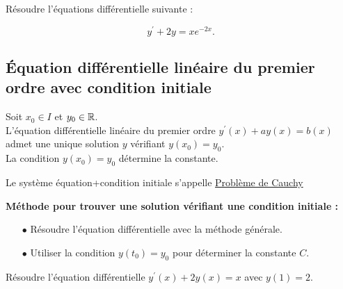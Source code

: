 \documentclass[a4paper, 11pt]{article}
\begin{document}
\newpage
\begin{exercice}
  R\'esoudre l'\'equations diff\'erentielle suivante :

  $$y^{\prime}+2y=xe^{-2x}.$$

\end{exercice}

\newpage



\subsection{\'Equation diff\'erentielle lin\'eaire du premier ordre avec condition initiale}


\begin{prop}
  Soit $x_0\in I$ et $y_0\in\mathbb{R}$.\\
  \noindent L'\'equation diff\'erentielle lin\'eaire du premier ordre $y^{\prime}(x)+ay(x)=b(x)$ admet
  une unique solution $y$ v\'erifiant $y(x_0)=y_0$.\\
  \noindent La condition $y(x_0)=y_0$ d\'etermine la constante.
\end{prop}
\begin{defi}
  Le système équation+condition initiale s'appelle \underline{Problème de Cauchy}
\end{defi}





\begin{minipage}{0.9\textwidth}
  \begin{tcolorbox}[colback=red!5!white,colframe=red!75!black]

    \textbf{M\'ethode pour trouver une solution v\'erifiant une condition initiale :}
    \begin{itemize}
      \item[$\bullet$] R\'esoudre l'\'equation diff\'erentielle avec la m\'ethode g\'en\'erale.
      \item[$\bullet$] Utiliser la condition $y(t_0) = y_0$ pour d\'eterminer la constante $C$.
    \end{itemize}

  \end{tcolorbox}
\end{minipage}

\begin{exercice}
  R\'esoudre l'\'equation diff\'erentielle $y^{\prime}(x)+2y(x)=x$ avec $y(1)=2$.
\end{exercice}
\end{document}
